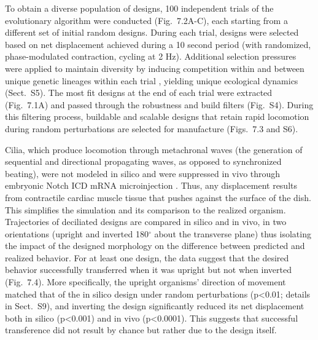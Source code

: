 To obtain a diverse population of designs, 100 independent trials of the evolutionary algorithm were conducted (Fig.~7.2A-C), each starting from a different set of initial random designs. 
During each trial, designs were selected based on net displacement achieved during a 10 second period (with randomized, phase-modulated contraction, cycling at 2 Hz). 
Additional selection pressures were applied to maintain diversity by inducing competition within and between unique genetic lineages within each trial \cite{schmidt2011age}, yielding unique ecological dynamics (Sect.~S5). 
The most fit designs at the end of each trial were extracted (Fig.~7.1A) and passed through the robustness and build filters (Fig.~S4). During this filtering process, buildable and scalable designs that retain rapid locomotion during random perturbations are selected for manufacture (Figs.~7.3 and S6). 

Cilia, which produce locomotion through metachronal waves (the generation of sequential and directional propagating waves, as opposed to synchronized beating), were not modeled in silico and were suppressed in vivo through embryonic Notch ICD mRNA microinjection \cite{deblandre1999two}. 
Thus, any displacement results from contractile cardiac muscle tissue that pushes against the surface of the dish. 
This simplifies the simulation and its comparison to the realized organism. 
Trajectories of deciliated designs are compared in silico and in vivo, in two orientations (upright and inverted 180{$^{\circ}$} about the transverse plane) thus isolating the impact of the designed morphology on the difference between predicted and realized behavior. 
For at least one design, the data suggest that the desired behavior successfully transferred when it was upright but not when inverted (Fig.~7.4). 
More specifically, the upright organisms' direction of movement matched that of the in silico design under random perturbations (p<0.01; details in Sect.~S9), and inverting the design significantly reduced its net displacement both in silico (p<0.001) and in vivo (p<0.0001). 
This suggests that successful transference did not result by chance but rather due to the design itself. 


